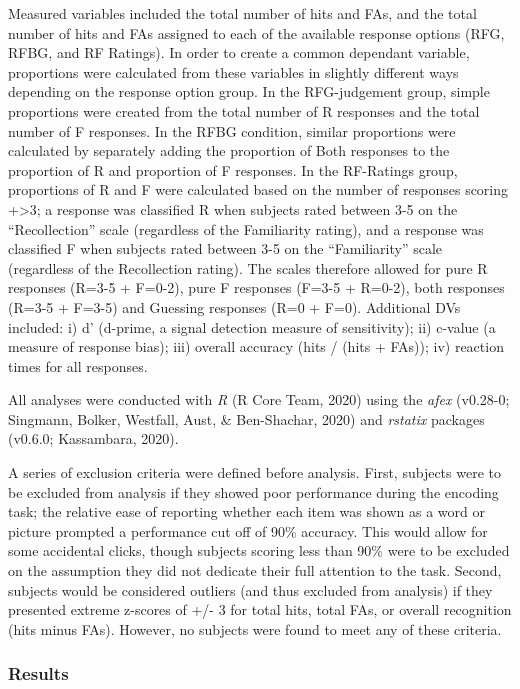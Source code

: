 \documentclass[
  11pt,
]{article}
\begin{document}
\hfill\break Measured variables included the total number of hits and
FAs, and the total number of hits and FAs assigned to each of the
available response options (RFG, RFBG, and RF Ratings). In order to
create a common dependant variable, proportions were calculated from
these variables in slightly different ways depending on the response
option group. In the RFG-judgement group, simple proportions were
created from the total number of R responses and the total number of F
responses. In the RFBG condition, similar proportions were calculated by
separately adding the proportion of Both responses to the proportion of
R and proportion of F responses. In the RF-Ratings group, proportions of
R and F were calculated based on the number of responses scoring
+\textgreater3; a response was classified R when subjects rated between
3-5 on the ``Recollection'' scale (regardless of the Familiarity
rating), and a response was classified F when subjects rated between 3-5
on the ``Familiarity'' scale (regardless of the Recollection rating).
The scales therefore allowed for pure R responses (R=3-5 + F=0-2), pure
F responses (F=3-5 + R=0-2), both responses (R=3-5 + F=3-5) and Guessing
responses (R=0 + F=0). Additional DVs included: i) d' (d-prime, a signal
detection measure of sensitivity); ii) c-value (a measure of response
bias); iii) overall accuracy (hits / (hits + FAs)); iv) reaction times
for all responses.

All analyses were conducted with \emph{R} (R Core Team, 2020) using the
\emph{afex} (v0.28-0; Singmann, Bolker, Westfall, Aust, \& Ben-Shachar,
2020) and \emph{rstatix} packages (v0.6.0; Kassambara, 2020).

A series of exclusion criteria were defined before analysis. First,
subjects were to be excluded from analysis if they showed poor
performance during the encoding task; the relative ease of reporting
whether each item was shown as a word or picture prompted a performance
cut off of 90\% accuracy. This would allow for some accidental clicks,
though subjects scoring less than 90\% were to be excluded on the
assumption they did not dedicate their full attention to the task.
Second, subjects would be considered outliers (and thus excluded from
analysis) if they presented extreme z-scores of +/- 3 for total hits,
total FAs, or overall recognition (hits minus FAs). However, no subjects
were found to meet any of these criteria.

\hypertarget{results}{%
\subsubsection{Results}\label{results}}
\end{document}
